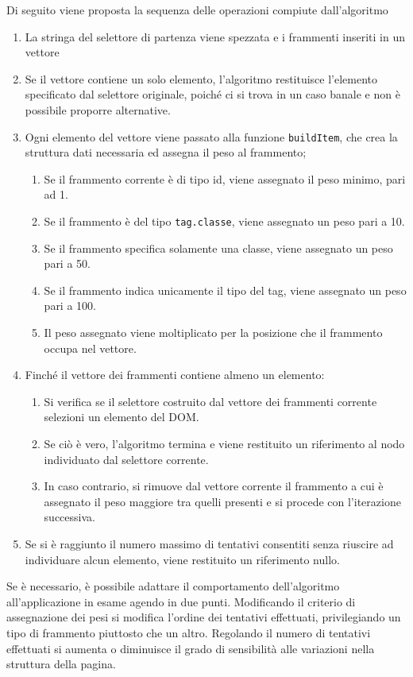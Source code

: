 \documentclass[12pt]{toptesi}
\begin{document}
Di seguito viene proposta la sequenza delle operazioni compiute dall'algoritmo

\begin{enumerate}
\item La stringa del selettore di partenza viene spezzata e i frammenti inseriti in un vettore
\item Se il vettore contiene un solo elemento, l'algoritmo restituisce l'elemento specificato dal selettore originale, poiché ci si trova in un caso banale e non è possibile proporre alternative.
\item Ogni elemento del vettore viene passato alla funzione \verb|buildItem|, che crea la struttura dati necessaria ed assegna il peso al frammento;
	\begin{enumerate}
		\item Se il frammento corrente è di tipo id, viene assegnato il peso minimo, pari ad 1.
		\item Se il frammento è del tipo \verb|tag.classe|, viene assegnato un peso pari a 10.
		\item Se il frammento specifica solamente una classe, viene assegnato un peso pari a 50.
		\item Se il frammento indica unicamente il tipo del tag, viene assegnato un peso pari a 100.
		\item Il peso assegnato viene moltiplicato per la posizione che il frammento occupa nel vettore.
	\end{enumerate}
\item Finché il vettore dei frammenti contiene almeno un elemento:
	\begin{enumerate}
		\item Si verifica se il selettore costruito dal vettore dei frammenti corrente selezioni un elemento del DOM.
		\item Se ciò è vero, l'algoritmo termina e viene restituito un riferimento al nodo individuato dal selettore corrente.
		\item In caso contrario, si rimuove dal vettore corrente il frammento a cui è assegnato il peso maggiore tra quelli presenti e si procede con l'iterazione successiva.
	\end{enumerate}	
\item Se si è raggiunto il numero massimo di tentativi consentiti senza riuscire ad individuare alcun elemento, viene restituito un riferimento nullo.
\end{enumerate}

Se è necessario, è possibile adattare il comportamento dell'algoritmo all'applicazione in esame agendo in due punti. Modificando il criterio di assegnazione dei pesi si modifica l'ordine dei tentativi effettuati, privilegiando un tipo di frammento piuttosto che un altro. Regolando il numero di tentativi effettuati si aumenta o diminuisce il grado di sensibilità alle variazioni nella struttura della pagina.
\end{document}
